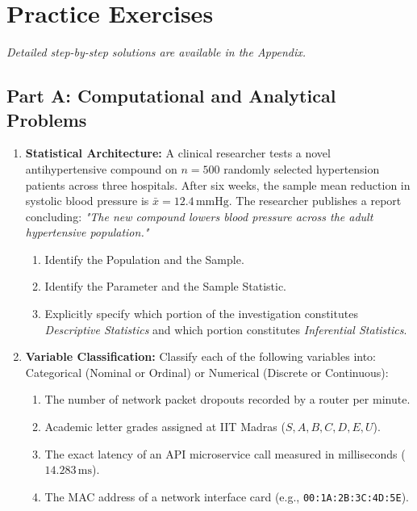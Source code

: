 \newpage
\section{Practice Exercises}
\textit{Detailed step-by-step solutions are available in the Appendix.}

\subsection*{Part A: Computational and Analytical Problems}

\begin{enumerate}
    \item \textbf{Statistical Architecture:} A clinical researcher tests a novel antihypertensive compound on $n = 500$ randomly selected hypertension patients across three hospitals. After six weeks, the sample mean reduction in systolic blood pressure is $\bar{x} = 12.4\,\text{mmHg}$. The researcher publishes a report concluding: \textit{"The new compound lowers blood pressure across the adult hypertensive population."}
    \begin{enumerate}
        \item Identify the Population and the Sample.
        \item Identify the Parameter and the Sample Statistic.
        \item Explicitly specify which portion of the investigation constitutes \emph{Descriptive Statistics} and which portion constitutes \emph{Inferential Statistics}.
    \end{enumerate}

    \item \textbf{Variable Classification:} Classify each of the following variables into: Categorical (Nominal or Ordinal) or Numerical (Discrete or Continuous):
    \begin{enumerate}
        \item The number of network packet dropouts recorded by a router per minute.
        \item Academic letter grades assigned at IIT Madras ($S, A, B, C, D, E, U$).
        \item The exact latency of an API microservice call measured in milliseconds ($14.283\,\text{ms}$).
        \item The MAC address of a network interface card (e.g., \texttt{00:1A:2B:3C:4D:5E}).
    \end{enumerate}


\end{enumerate}
